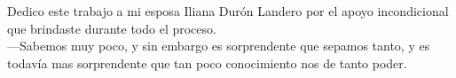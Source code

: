 




Dedico este trabajo a mi esposa Iliana Dur\'on Landero por el apoyo incondicional
que brindaste durante todo el proceso.\\


---Sabemos muy poco, y sin embargo es
sorprendente que sepamos tanto, y es todav\'ia mas sorprendente que tan poco
conocimiento nos de tanto poder.



